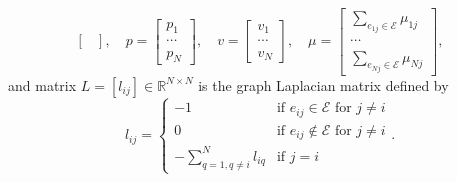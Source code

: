 \documentclass[12pt,draftcls,onecolumn]{IEEEtran}  %
\begin{document}
{\begin{thm}
\[\begin{bmatrix}
\end{bmatrix},\quad
p=\begin{bmatrix}
p_1\\ \cdots\\ p_N
\end{bmatrix},\quad
v=\begin{bmatrix}
v_1\\ \cdots\\v_N
\end{bmatrix},\quad \mu=\begin{bmatrix}
\sum_{e_{1j}\in{\mathcal{E}}}\mu_{1j}\\
\cdots\\
\sum_{e_{Nj}\in{\mathcal{E}}}\mu_{Nj}
\end{bmatrix},\]
and matrix $L=[l_{ij}]\in\mathbb{R}^{N\times N}$ is the graph Laplacian matrix defined by
\begin{equation}
l_{ij}=\left\{\begin{array}{ll}
-1&\mbox{if $e_{ij}\in\mathcal{E}$ for $j\neq i$}\\
0&\mbox{if $e_{ij}\notin\mathcal{E}$ for $j\neq i$}\\
\displaystyle -\sum^N_{q=1,q\neq i}l_{iq}&\mbox{if $j=i$}
\end{array}\right..\label{laplacian}
\end{equation}
\end{thm}

}
\end{document}
